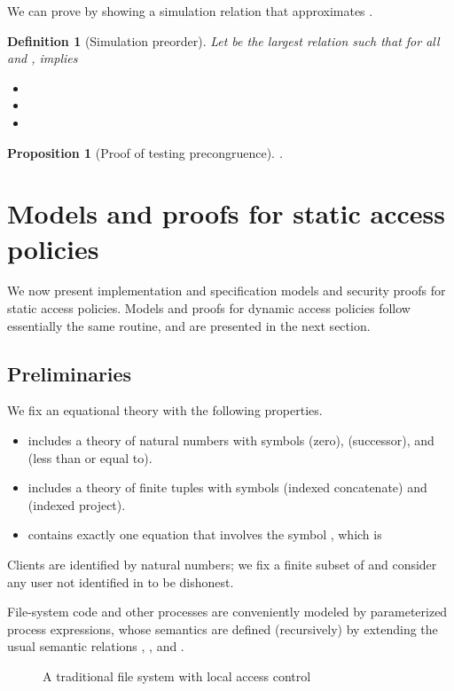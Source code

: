 \documentclass[10pt]{article}
\newtheorem{definition}{Definition}
\newtheorem{proposition}[theorem]{Proposition}
\begin{document}
We can prove  by showing a simulation relation that approximates .
\begin{definition}[Simulation preorder]
Let  be the largest relation  such that for all  and ,  implies
\begin{itemize}
\item 
\item 
\item 
\end{itemize}
\end{definition}
\begin{proposition}[Proof of testing precongruence]\label{pf-prec} . 
\end{proposition}

\section{Models and proofs for static access policies}\label{sec:mpstat}
We now present implementation and specification models and security proofs for static access policies. Models and proofs for dynamic access policies follow essentially the same routine, and are presented in the next section.

\subsection{Preliminaries}
We fix an equational theory  with the following properties.
\begin{itemize}
\item  includes a theory of natural numbers with symbols  (zero),  (successor), and  (less than or equal to).
\item  includes a theory of finite tuples with symbols  (indexed concatenate) and  (indexed project).
\item  contains exactly one equation that involves the symbol , which is

\end{itemize}
Clients are identified by natural numbers; we fix a finite subset  of  and consider any user not identified in  to be dishonest. 

File-system code and other processes are conveniently modeled by parameterized process expressions, whose semantics are defined (recursively) by extending the usual semantic relations , , and . 

\begin{figure}
\hspace{-0.55cm}
\fbox{\parbox{13.0cm}{\small


\fbox{\parbox{12.75cm}{


}}
}}
\caption{A traditional file system with local access control}
\label{fig:ts-s}
\end{figure}
\end{document}
